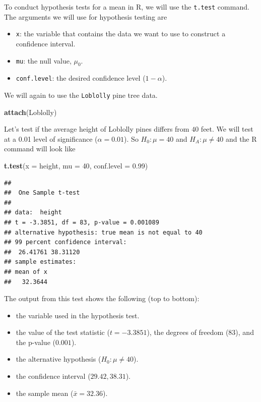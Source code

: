 \documentclass[
]{book}
\newenvironment{Shaded}{\begin{snugshade}}{\end{snugshade}}
\newcommand{\AttributeTok}[1]{\textcolor[rgb]{0.13,0.29,0.53}{#1}}
\newcommand{\DecValTok}[1]{\textcolor[rgb]{0.00,0.00,0.81}{#1}}
\newcommand{\FloatTok}[1]{\textcolor[rgb]{0.00,0.00,0.81}{#1}}
\newcommand{\FunctionTok}[1]{\textcolor[rgb]{0.13,0.29,0.53}{\textbf{#1}}}
\newcommand{\NormalTok}[1]{#1}
\providecommand{\tightlist}{%
  \setlength{\itemsep}{0pt}\setlength{\parskip}{0pt}}
\begin{document}
To conduct hypothesis tests for a mean in R, we will use the \texttt{t.test} command. The arguments we will use for hypothesis testing are

\begin{itemize}
\tightlist
\item
  \texttt{x}: the variable that contains the data we want to use to construct a confidence interval.
\item
  \texttt{mu}: the null value, \(\mu_0\).
\item
  \texttt{conf.level}: the desired confidence level (\(1-\alpha\)).
\end{itemize}

We will again to use the \texttt{Loblolly} pine tree data.

\begin{Shaded}
\begin{Highlighting}[]
\FunctionTok{attach}\NormalTok{(Loblolly)}
\end{Highlighting}
\end{Shaded}

Let's test if the average height of Loblolly pines differs from \(40\) feet. We will test at a 0.01 level of significance (\(\alpha = 0.01\)). So \(H_0: \mu = 40\) and \(H_A: \mu \ne 40\) and the R command will look like

\begin{Shaded}
\begin{Highlighting}[]
\FunctionTok{t.test}\NormalTok{(}\AttributeTok{x =}\NormalTok{ height, }\AttributeTok{mu =} \DecValTok{40}\NormalTok{, }\AttributeTok{conf.level =} \FloatTok{0.99}\NormalTok{)}
\end{Highlighting}
\end{Shaded}

\begin{verbatim}
## 
##  One Sample t-test
## 
## data:  height
## t = -3.3851, df = 83, p-value = 0.001089
## alternative hypothesis: true mean is not equal to 40
## 99 percent confidence interval:
##  26.41761 38.31120
## sample estimates:
## mean of x 
##   32.3644
\end{verbatim}

The output from this test shows the following (top to bottom):

\begin{itemize}
\tightlist
\item
  the variable used in the hypothesis test.
\item
  the value of the test statistic (\(t = -3.3851\)), the degrees of freedom (\(83\)), and the p-value (\(0.001\)).
\item
  the alternative hypothesis (\(H_0: \mu\ne 40\)).
\item
  the confidence interval (\(29.42, 38.31\)).
\item
  the sample mean (\(\bar{x} = 32.36\)).
\end{itemize}
\end{document}
